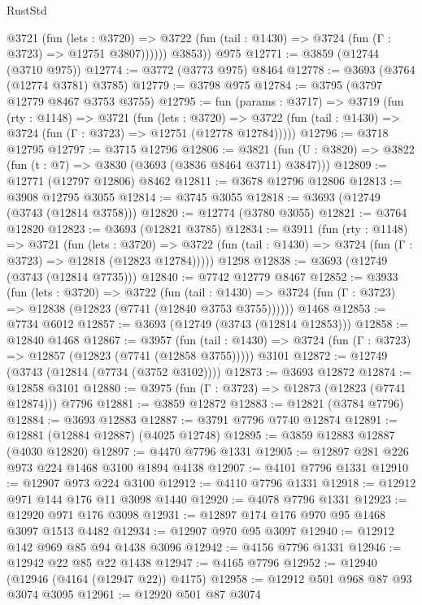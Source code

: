 \begin{lexlean}{RustStd}
\begin{coremodule}
            @3721
              (fun (lets : @3720) =>
              @3722 (fun (tail : @1430) => @3724 (fun (Γ : @3723) => @12751 @3807))))))
        @3853))
    @975
@12771 := @3859 (@12744 (@3710 @975))
@12774 := @3772 (@3773 @975) @8464
@12778 := @3693 (@3764 (@12774 @3781) @3785)
@12779 := @3798 @975
@12784 := @3795 (@3797 @12779 @8467 @3753 @3755)
@12795 := fun (params : @3717) =>
  @3719
    (fun (rty : @1148) =>
    @3721
      (fun (lets : @3720) =>
      @3722 (fun (tail : @1430) => @3724 (fun (Γ : @3723) => @12751 (@12778 @12784)))))
@12796 := @3718 @12795
@12797 := @3715 @12796
@12806 := @3821 (fun (U : @3820) => @3822 (fun (t : @7) => @3830 (@3693 (@3836 @8464 @3711) @3847)))
@12809 := @12771 (@12797 @12806) @8462
@12811 := @3678 @12796 @12806
@12813 := @3908 @12795 @3055
@12814 := @3745 @3055
@12818 := @3693 (@12749 (@3743 (@12814 @3758)))
@12820 := @12774 (@3780 @3055)
@12821 := @3764 @12820
@12823 := @3693 (@12821 @3785)
@12834 := @3911
    (fun (rty : @1148) =>
    @3721
      (fun (lets : @3720) =>
      @3722 (fun (tail : @1430) => @3724 (fun (Γ : @3723) => @12818 (@12823 @12784)))))
    @1298
@12838 := @3693 (@12749 (@3743 (@12814 @7735)))
@12840 := @7742 @12779 @8467
@12852 := @3933
    (fun (lets : @3720) =>
    @3722
      (fun (tail : @1430) =>
      @3724 (fun (Γ : @3723) => @12838 (@12823 (@7741 (@12840 @3753 @3755))))))
    @1468
@12853 := @7734 @6012
@12857 := @3693 (@12749 (@3743 (@12814 @12853)))
@12858 := @12840 @1468
@12867 := @3957
    (fun (tail : @1430) => @3724 (fun (Γ : @3723) => @12857 (@12823 (@7741 (@12858 @3755)))))
    @3101
@12872 := @12749 (@3743 (@12814 (@7734 (@3752 @3102))))
@12873 := @3693 @12872
@12874 := @12858 @3101
@12880 := @3975 (fun (Γ : @3723) => @12873 (@12823 (@7741 @12874))) @7796
@12881 := @3859 @12872
@12883 := @12821 (@3784 @7796)
@12884 := @3693 @12883
@12887 := @3791 @7796 @7740 @12874
@12891 := @12881 (@12884 @12887) (@4025 @12748)
@12895 := @3859 @12883 @12887 (@4030 @12820)
@12897 := @4470 @7796 @1331
@12905 := @12897 @281 @226 @973 @224 @1468 @3100 @1894 @4138
@12907 := @4101 @7796 @1331
@12910 := @12907 @973 @224 @3100
@12912 := @4110 @7796 @1331
@12918 := @12912 @971 @144 @176 @11 @3098 @1440
@12920 := @4078 @7796 @1331
@12923 := @12920 @971 @176 @3098
@12931 := @12897 @174 @176 @970 @95 @1468 @3097 @1513 @4482
@12934 := @12907 @970 @95 @3097
@12940 := @12912 @142 @969 @85 @94 @1438 @3096
@12942 := @4156 @7796 @1331
@12946 := @12942 @22 @85 @22 @1438
@12947 := @4165 @7796
@12952 := @12940 (@12946 (@4164 (@12947 @22)) @4175)
@12958 := @12912 @501 @968 @87 @93 @3074 @3095
@12961 := @12920 @501 @87 @3074

\end{coremodule}
\end{lexlean}
